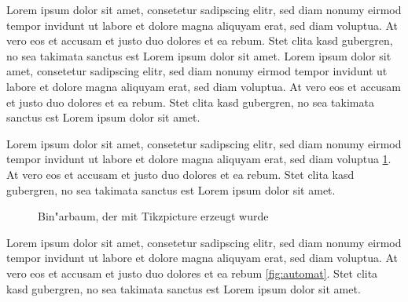 \documentclass[12pt]{scrartcl}
\begin{document}

Lorem ipsum dolor sit amet, consetetur sadipscing elitr, sed diam nonumy eirmod tempor invidunt ut labore et dolore magna aliquyam erat, sed diam voluptua. At vero eos et accusam et justo duo dolores et ea rebum. Stet clita kasd gubergren, no sea takimata sanctus est Lorem ipsum dolor sit amet. Lorem ipsum dolor sit amet, consetetur sadipscing elitr, sed diam nonumy eirmod tempor invidunt ut labore et dolore magna aliquyam erat, sed diam voluptua. At vero eos et accusam et justo duo dolores et ea rebum. Stet clita kasd gubergren, no sea takimata sanctus est Lorem ipsum dolor sit amet.

Lorem ipsum dolor sit amet, consetetur sadipscing elitr, sed diam nonumy eirmod tempor invidunt ut labore et dolore magna aliquyam erat, sed diam voluptua \ref{fig:baum}. At vero eos et accusam et justo duo dolores et ea rebum. Stet clita kasd gubergren, no sea takimata sanctus est Lorem ipsum dolor sit amet.
\begin{figure}[!h]
\centering
{}
\caption{Bin"arbaum, der mit Tikzpicture erzeugt wurde}
\label{fig:baum}
\end{figure}
Lorem ipsum dolor sit amet, consetetur sadipscing elitr, sed diam nonumy eirmod tempor invidunt ut labore et dolore magna aliquyam erat, sed diam voluptua. At vero eos et accusam et justo duo dolores et ea rebum \ref{fig:automat}. Stet clita kasd gubergren, no sea takimata sanctus est Lorem ipsum dolor sit amet.
\end{document}
